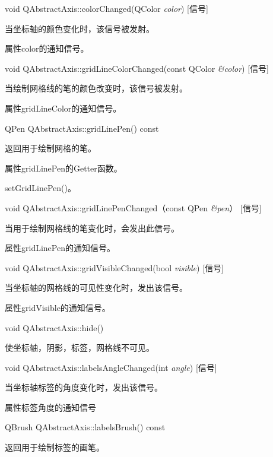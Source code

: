 void QAbstractAxis::colorChanged(QColor \emph{color}) [信号] 

当坐标轴的颜色变化时，该信号被发射。 

\begin{notice}
属性color的通知信号。
\end{notice}

void QAbstractAxis::gridLineColorChanged(const QColor \emph{\&color}) [信号] 

当绘制网格线的笔的颜色改变时，该信号被发射。

\begin{notice}
属性gridLineColor的通知信号。
\end{notice}

QPen QAbstractAxis::gridLinePen() const

返回用于绘制网格的笔。 

\begin{notice}
属性gridLinePen的Getter函数。 
\end{notice}

\begin{seeAlso}
setGridLinePen()。
\end{seeAlso}

void QAbstractAxis::gridLinePenChanged（const QPen \emph{\&pen}） [信号] 

当用于绘制网格线的笔变化时，会发出此信号。 

\begin{notice}
属性gridLinePen的通知信号。
\end{notice}

void QAbstractAxis::gridVisibleChanged(bool \emph{visible}) [信号] 

当坐标轴的网格线的可见性变化时，发出该信号。 

\begin{notice}
属性gridVisible的通知信号。
\end{notice}

void QAbstractAxis::hide() 

使坐标轴，阴影，标签，网格线不可见。

void QAbstractAxis::labelsAngleChanged(int \emph{angle}) [信号]

当坐标轴标签的角度变化时，发出该信号。 

\begin{notice}
属性标签角度的通知信号
\end{notice}

QBrush QAbstractAxis::labelsBrush() const 

返回用于绘制标签的画笔。 

